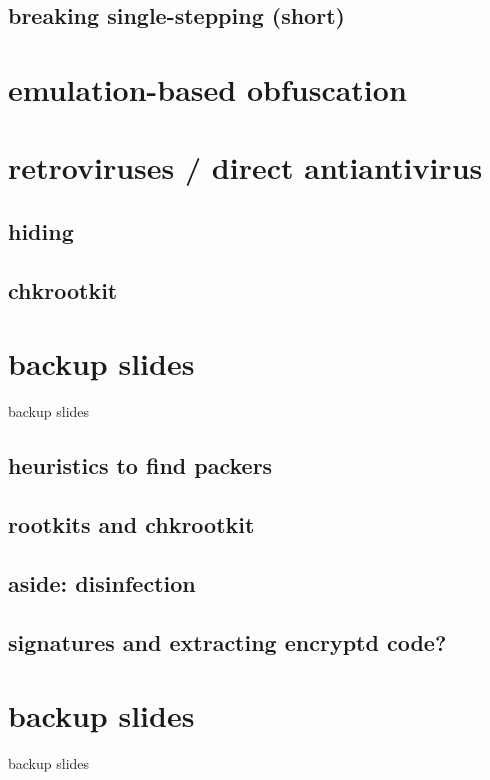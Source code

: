 \subsection{breaking single-stepping (short)}


\section{emulation-based obfuscation}


\section{retroviruses / direct antiantivirus}


\subsection{hiding}


\subsection{chkrootkit}



\section{backup slides}
\begin{frame}{backup slides}
\end{frame}

\subsection{heuristics to find packers}


\subsection{rootkits and chkrootkit}


\subsection{aside: disinfection}


\subsection{signatures and extracting encryptd code?}



\section{backup slides}
\begin{frame}{backup slides}
\end{frame}




